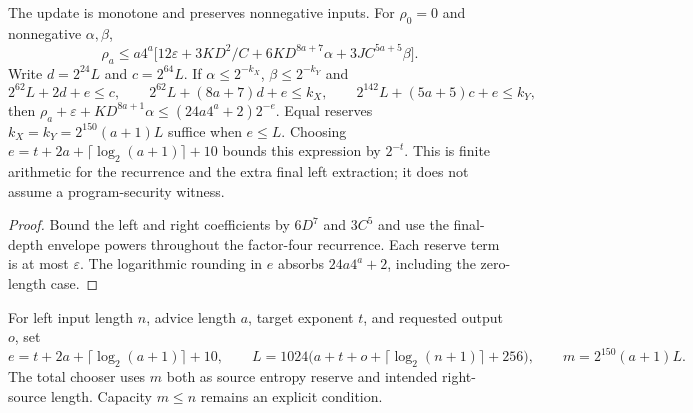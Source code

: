 \begin{theorem}
  \label{thm:lowerbounds-algebraic-advice-error-bounds}
  \leanok
  The update is monotone and preserves nonnegative inputs. For
  $\rho_0=0$ and nonnegative $\alpha,\beta$,
  \[
    \rho_a\le a4^a\bigl[12\varepsilon+3KD^2/C+
      6KD^{8a+7}\alpha+3JC^{5a+5}\beta\bigr].
  \]
  Write $d=2^{24}L$ and $c=2^{64}L$. If
  $\alpha\le2^{-k_X}$, $\beta\le2^{-k_Y}$ and
  \[
    2^{62}L+2d+e\le c,\qquad
    2^{62}L+(8a+7)d+e\le k_X,\qquad
    2^{142}L+(5a+5)c+e\le k_Y,
  \]
  then $\rho_a+\varepsilon+KD^{8a+1}\alpha
    \le(24a4^a+2)2^{-e}$.
  Equal reserves $k_X=k_Y=2^{150}(a+1)L$ suffice when $e\le L$.
  Choosing $e=t+2a+\lceil\log_2(a+1)\rceil+10$ bounds this expression
  by $2^{-t}$. This is finite arithmetic for the recurrence and the
  extra final left extraction; it does not assume a program-security witness.
\end{theorem}
\begin{proof}
  \leanok
  Bound the left and right coefficients by $6D^7$ and $3C^5$ and use
  the final-depth envelope powers throughout the factor-four recurrence.
  Each reserve term is at most $\varepsilon$. The logarithmic rounding
  in $e$ absorbs $24a4^a+2$, including the zero-length case.
\end{proof}

\begin{definition}
  \label{def:lowerbounds-algebraic-advice-parameters}
  \leanok
  For left input length $n$, advice length $a$, target exponent $t$, and
  requested output $o$, set
  \[
    e=t+2a+\lceil\log_2(a+1)\rceil+10,\qquad
    L=1024\bigl(a+t+o+\lceil\log_2(n+1)\rceil+256\bigr),\qquad
    m=2^{150}(a+1)L.
  \]
  The total chooser uses $m$ both as source entropy reserve and intended
  right-source length. Capacity $m\le n$ remains an explicit condition.
\end{definition}

